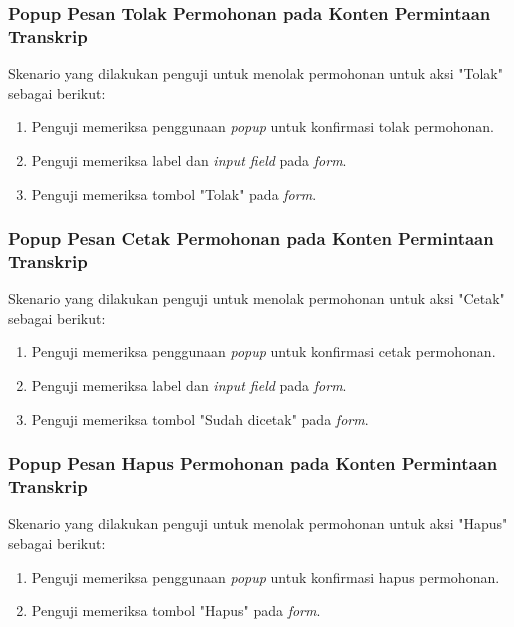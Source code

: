 \subsubsection{Popup Pesan Tolak Permohonan pada Konten Permintaan Transkrip}
Skenario yang dilakukan penguji untuk menolak permohonan untuk aksi "Tolak" sebagai berikut:
\begin{enumerate}
	\item Penguji memeriksa penggunaan \textit{popup} untuk konfirmasi tolak permohonan.
	\item Penguji memeriksa label dan \textit{input field} pada \textit{form}.
	\item Penguji memeriksa tombol "Tolak" pada \textit{form}.	
\end{enumerate}

\subsubsection{Popup Pesan Cetak Permohonan pada Konten Permintaan Transkrip}
Skenario yang dilakukan penguji untuk menolak permohonan untuk aksi "Cetak" sebagai berikut:
\begin{enumerate}
	\item Penguji memeriksa penggunaan \textit{popup} untuk konfirmasi cetak permohonan.
	\item Penguji memeriksa label dan \textit{input field} pada \textit{form}.
	\item Penguji memeriksa tombol "Sudah dicetak" pada \textit{form}.	
\end{enumerate}

\subsubsection{Popup Pesan Hapus Permohonan pada Konten Permintaan Transkrip}
Skenario yang dilakukan penguji untuk menolak permohonan untuk aksi "Hapus" sebagai berikut:
\begin{enumerate}
	\item Penguji memeriksa penggunaan \textit{popup} untuk konfirmasi hapus permohonan.
	\item Penguji memeriksa tombol "Hapus" pada \textit{form}.	
\end{enumerate}

